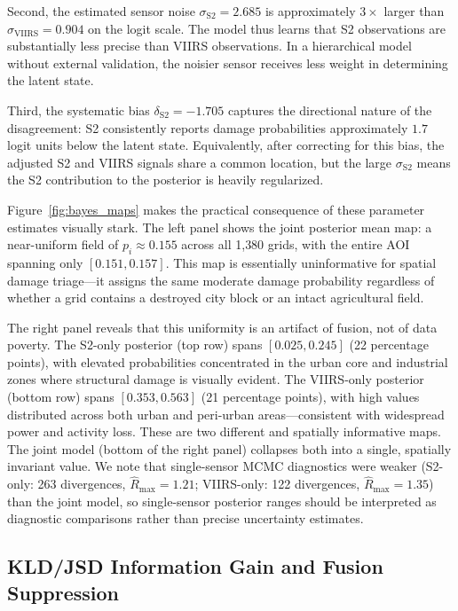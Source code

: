 \documentclass[wcp]{jmlr}
\begin{document}
Second, the estimated sensor noise $\sigma_{\text{S2}} = 2.685$ is
approximately $3\times$ larger than $\sigma_{\text{VIIRS}} = 0.904$ on the
logit scale. The model thus learns that S2 observations are substantially
less precise than VIIRS observations. In a hierarchical model without
external validation, the noisier sensor receives less weight in determining
the latent state.

Third, the systematic bias $\delta_{\text{S2}} = -1.705$ captures the
directional nature of the disagreement: S2 consistently reports damage
probabilities approximately $1.7$ logit units below the latent state.
Equivalently, after correcting for this bias, the adjusted S2 and VIIRS
signals share a common location, but the large $\sigma_{\text{S2}}$ means
the S2 contribution to the posterior is heavily regularized.

Figure~\ref{fig:bayes_maps} makes the practical consequence of these
parameter estimates visually stark. The left panel shows the joint
posterior mean map: a near-uniform field of $p_i \approx 0.155$ across all
1{,}380 grids, with the entire AOI spanning only $[0.151, 0.157]$. This
map is essentially uninformative for spatial damage triage---it assigns the
same moderate damage probability regardless of whether a grid contains a
destroyed city block or an intact agricultural field.

The right panel reveals that this uniformity is an artifact of fusion, not
of data poverty. The S2-only posterior (top row) spans $[0.025, 0.245]$
(22 percentage points), with elevated probabilities concentrated in the
urban core and industrial zones where structural damage is visually
evident. The VIIRS-only posterior (bottom row) spans $[0.353, 0.563]$ (21
percentage points), with high values distributed across both urban and
peri-urban areas---consistent with widespread power and activity loss.
These are two different and spatially informative maps. The joint model
(bottom of the right panel) collapses both into a single, spatially
invariant value. We note that single-sensor MCMC diagnostics were weaker
(S2-only: 263 divergences, $\hat{R}_{\max}=1.21$; VIIRS-only: 122
divergences, $\hat{R}_{\max}=1.35$) than the joint model, so single-sensor
posterior ranges should be interpreted as diagnostic comparisons rather
than precise uncertainty estimates.

\subsection{KLD/JSD Information Gain and Fusion Suppression}
\end{document}
